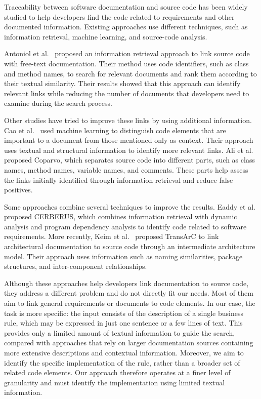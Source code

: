 Traceability between software documentation and source code has been widely studied to help developers find the code related to requirements and other documented information. Existing approaches use different techniques, such as information retrieval, machine learning, and source-code analysis.

Antoniol et al.~\cite{Anto02b} proposed an information retrieval approach to link source code with free-text documentation. Their method uses code identifiers, such as class and method names, to search for relevant documents and rank them according to their textual similarity. Their results showed that this approach can identify relevant links while reducing the number of documents that developers need to examine during the search process.

Other studies have tried to improve these links by using additional information. Cao et al.~\cite{Cao18a} used machine learning to distinguish code elements that are important to a document from those mentioned only as context. Their approach uses textual and structural information to identify more relevant links. Ali et al.~\cite{Ali11a} proposed Coparvo, which separates source code into different parts, such as class names, method names, variable names, and comments. These parts help assess the links initially identified through information retrieval and reduce false positives.

Some approaches combine several techniques to improve the results. Eaddy et al.~\cite{Eaddy08a} proposed CERBERUS, which combines information retrieval with dynamic analysis and program dependency analysis to identify code related to software requirements. More recently, Keim et al.~\cite{Keim24a} proposed TransArC to link architectural documentation to source code through an intermediate architecture model. Their approach uses information such as naming similarities, package structures, and inter-component relationships.

Although these approaches help developers link documentation to source code, they address a different problem and do not directly fit our needs. Most of them aim to link general requirements or documents to code elements. In our case, the task is more specific: the input consists of the description of a single business rule, which may be expressed in just one sentence or a few lines of text. This provides only a limited amount of textual information to guide the search, compared with approaches that rely on larger documentation sources containing more extensive descriptions and contextual information. Moreover, we aim to identify the specific implementation of the rule, rather than a broader set of related code elements. Our approach therefore operates at a finer level of granularity and must identify the implementation using limited textual information.